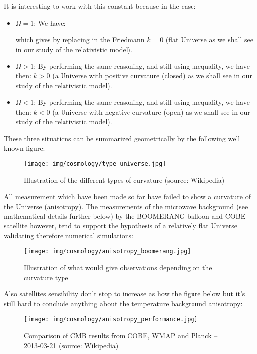 	It is interesting to work with this constant because in the case:
	\begin{itemize}
		\item $\Omega=1$:
		We have:
		
		which gives by replacing in the Friedmann $k=0$ (flat Universe as we shall see in our study of the relativistic model).

		\item $\Omega>1$:
		By performing the same reasoning, and still using inequality, we have then: $k>0$ (a Universe with positive curvature (closed) as we shall see in our study of the relativistic model).

		\item $\Omega<1$:
		By performing the same reasoning, and still using inequality, we have then: $k<0$ (a Universe with negative curvature (open) as we shall see in our study of the relativistic model).
	\end{itemize}
	These three situations can be summarized geometrically by the following well known figure:
	\begin{figure}[H]
		\begin{center}
		\texttt{[image: img/cosmology/type\_universe.jpg]}
		\end{center}	
		\caption{Illustration of the different types of curvature (source: Wikipedia)}
	\end{figure}
	All measurement which have been made so far have failed to show a curvature of the Universe (anisotropy). The measurements of the microwave background (see mathematical details further below) by the BOOMERANG balloon and COBE satellite however, tend to support the hypothesis of a relatively flat Universe validating therefore numerical simulations:
	\begin{figure}[H]
		\begin{center}
		\texttt{[image: img/cosmology/anisotropy\_boomerang.jpg]}
		\end{center}	
		\caption{Illustration of what would give observations depending on the curvature type}
	\end{figure}
	Also satellites sensibility don't stop to increase as how the figure below but it's still hard to conclude anything about the temperature background anisotropy:
	\begin{figure}[H]
		\begin{center}
		\texttt{[image: img/cosmology/anisotropy\_performance.jpg]}
		\end{center}	
		\caption{Comparison of CMB results from COBE, WMAP and Planck – 2013-03-21 (source: Wikipedia)}
	\end{figure}
